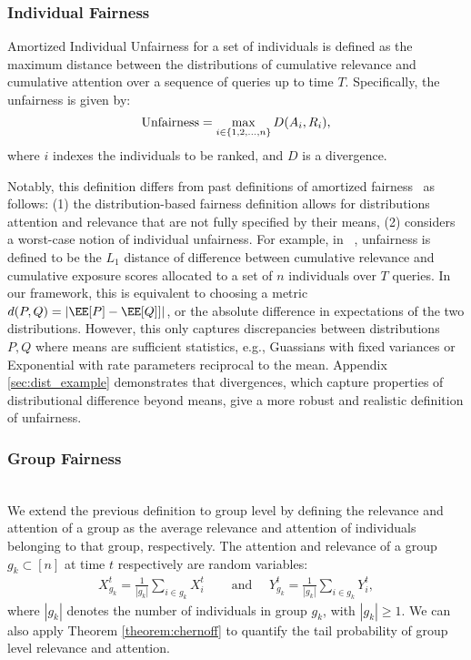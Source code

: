 \subsubsection{Individual Fairness}
\begin{definition} 
Amortized Individual Unfairness for a set of individuals is defined as the maximum distance between the distributions of cumulative relevance and cumulative attention over a sequence of queries up to time $T$. Specifically, the unfairness is given by:
\[
\text{Unfairness} = \max_{i \in \{1,2,\dots,n\}} D(A_i, R_i),
\]
where $i$ indexes the individuals to be ranked, and $D$ is a divergence.
\end{definition}

Notably, this definition differs from past definitions of amortized fairness~\cite{biega2018equity,singh2018fairness,singh2019policy,raj2022measuring} as follows: (1) the distribution-based fairness definition allows for distributions attention and relevance that are not fully specified by their means, (2) considers a worst-case notion of individual unfairness. For example, in ~\citep{biega2018equity}, unfairness is defined to be the $L_1$ distance of difference between cumulative relevance and cumulative exposure scores allocated to a set of $n$ individuals over $T$ queries. In our framework, this is equivalent to choosing a metric $d(P, Q) = |\EE[P] - \EE[Q]]|$, or the absolute difference in expectations of the two distributions. However, this only captures discrepancies between distributions $P, Q$ where means are sufficient statistics, e.g., Guassians with fixed variances or Exponential with rate parameters reciprocal to the mean. Appendix \ref{sec:dist_example} demonstrates that divergences, which capture properties of distributional difference beyond means, give a more robust and realistic definition of unfairness. %



\subsubsection{Group Fairness}~\\
We extend the previous definition to group level by defining the relevance and attention of a group as the average relevance and attention of individuals belonging to that group, respectively. The attention and relevance of a group $g_k \subset [n]$ at time $t$ respectively are random variables:
\begin{align}
    X_{g_{k}}^{t} = \frac{1}{|g_{k}|}\sum\nolimits_{i \in g_{k}} X_i^t & \quad \text{ and } \quad Y_{g_{k}}^{t} = \frac{1}{|g_{k}|} \sum\nolimits_{i \in g_k} Y_i^t ,
\end{align}
where $|g_{k}|$ denotes the number of individuals in group $g_{k}$, with $|g_{k}| \geq 1$. We can also apply Theorem \ref{theorem:chernoff} to quantify the tail probability of group level relevance and attention.

